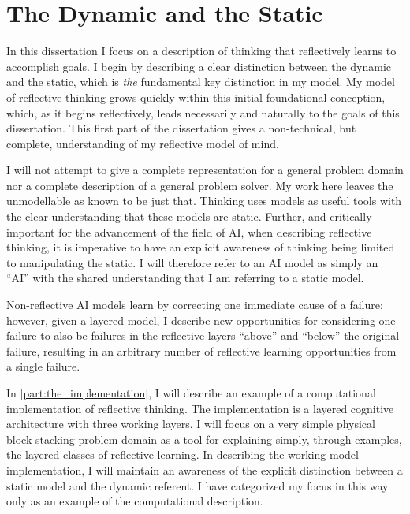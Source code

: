 \chapter{The Dynamic and the Static}
\label{chapter:the_dynamic_and_the_static}

In this dissertation I focus on a description of thinking that
reflectively learns to accomplish goals.  I begin by describing a
clear distinction between the dynamic and the static, which is
\emph{the} fundamental key distinction in my model.  My model of
reflective thinking grows quickly within this initial foundational
conception, which, as it begins reflectively, leads necessarily and
naturally to the goals of this dissertation.  This first part of the
dissertation gives a non-technical, but complete, understanding of my
reflective model of mind.

I will not attempt to give a complete representation for a general
problem domain nor a complete description of a general problem solver.
My work here leaves the unmodellable as known to be just that.
Thinking uses models as useful tools with the clear understanding that
these models are static.  Further, and critically important for the
advancement of the field of AI, when describing reflective thinking,
it is imperative to have an explicit awareness of thinking being
limited to manipulating the static.  I will therefore refer to an AI
model as simply an ``AI'' with the shared understanding that I am
referring to a static model.

Non-reflective AI models learn by correcting one immediate cause of a
failure; however, given a layered model, I describe new opportunities
for considering one failure to also be failures in the reflective
layers ``above'' and ``below'' the original failure, resulting in an
arbitrary number of reflective learning opportunities from a single
failure.

In \autoref{part:the_implementation}, I will describe an example of a
computational implementation of reflective thinking.  The
implementation is a layered cognitive architecture with three working
layers.  I will focus on a very simple physical block stacking problem
domain as a tool for explaining simply, through examples, the layered
classes of reflective learning.  In describing the working model
implementation, I will maintain an awareness of the explicit
distinction between a static model and the dynamic referent.  I have
categorized my focus in this way only as an example of the
computational description.


